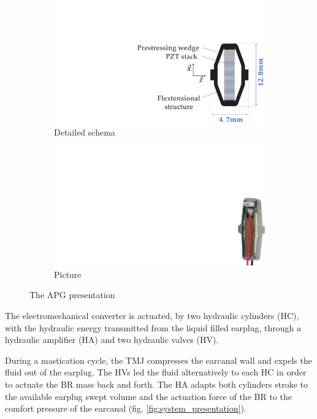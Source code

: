 \documentclass[3p,twocolumn,preprint]{elsarticle}
\def \hfillx {\hspace*{ -\linewidth} \hfill} %
\begin{document}
\begin{figure}[!htb]
	\begin{center}
		\begin{subfigure}[t]{0.5\linewidth}
			\captionsetup{justification=centering}
			\includegraphics[trim={13cm 0cm 0cm 6cm},clip,width=\linewidth]{figures/APG_schema.pdf}
			\caption{Detailed schema}
			\label{fig:APG_schema}
		\end{subfigure}
		\hfillx
		\begin{subfigure}[t]{0.21\linewidth}
			\captionsetup{justification=centering}
			\includegraphics[trim={29.5cm 0cm 0cm 8cm},clip,width=0.65\linewidth]{figures/APG_photo.pdf}
			\caption{Picture}
			\label{fig:APG_photo}
		\end{subfigure}
		\caption{The APG presentation}
		\label{fig:APG}
	\end{center}
\end{figure}

The electromechanical converter is actuated, by two hydraulic cylinders (HC), with the hydraulic energy transmitted from the liquid filled earplug, through a hydraulic amplifier (HA) and two hydraulic valves (HV).

During a mastication cycle, the TMJ compresses the earcanal wall and expels the fluid out of the earplug. The HVs led the fluid alternatively to each HC in order to actuate the BR mass back and forth. The HA adapts both cylinders stroke to the available earplug swept volume and the actuation force of the BR to the comfort pressure of the earcanal (fig. \ref{fig:system_presentation}).
\end{document}
